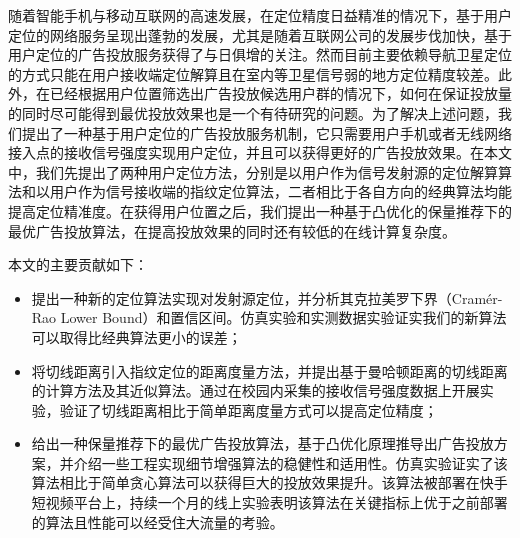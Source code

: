 \begin{cabstract}
  随着智能手机与移动互联网的高速发展，在定位精度日益精准的情况下，基于用户定位的网络服务呈现出蓬勃的发展，尤其是随着互联网公司的发展步伐加快，基于用户定位的广告投放服务获得了与日俱增的关注。然而目前主要依赖导航卫星定位的方式只能在用户接收端定位解算且在室内等卫星信号弱的地方定位精度较差。此外，在已经根据用户位置筛选出广告投放候选用户群的情况下，如何在保证投放量的同时尽可能得到最优投放效果也是一个有待研究的问题。为了解决上述问题，我们提出了一种基于用户定位的广告投放服务机制，它只需要用户手机或者无线网络接入点的接收信号强度实现用户定位，并且可以获得更好的广告投放效果。在本文中，我们先提出了两种用户定位方法，分别是以用户作为信号发射源的定位解算算法和以用户作为信号接收端的指纹定位算法，二者相比于各自方向的经典算法均能提高定位精准度。在获得用户位置之后，我们提出一种基于凸优化的保量推荐下的最优广告投放算法，在提高投放效果的同时还有较低的在线计算复杂度。

  本文的主要贡献如下：
  \begin{itemize}
    \item 提出一种新的定位算法实现对发射源定位，并分析其克拉美罗下界（Cram\'{e}r-Rao Lower Bound）和置信区间。仿真实验和实测数据实验证实我们的新算法可以取得比经典算法更小的误差；
    \item 将切线距离引入指纹定位的距离度量方法，并提出基于曼哈顿距离的切线距离的计算方法及其近似算法。通过在校园内采集的接收信号强度数据上开展实验，验证了切线距离相比于简单距离度量方式可以提高定位精度；
    \item 给出一种保量推荐下的最优广告投放算法，基于凸优化原理推导出广告投放方案，并介绍一些工程实现细节增强算法的稳健性和适用性。仿真实验证实了该算法相比于简单贪心算法可以获得巨大的投放效果提升。该算法被部署在快手短视频平台上，持续一个月的线上实验表明该算法在关键指标上优于之前部署的算法且性能可以经受住大流量的考验。
  \end{itemize}


\end{cabstract}


